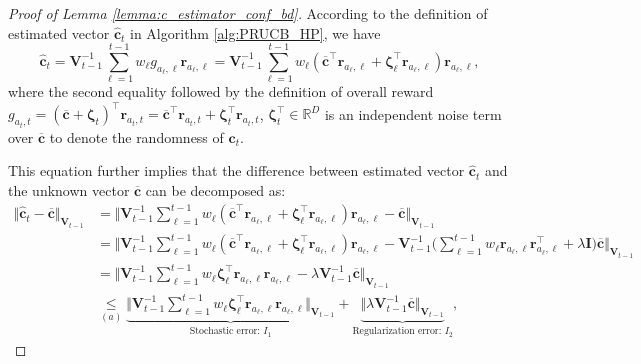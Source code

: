 \begin{proof}[Proof of Lemma \ref{lemma:c_estimator_conf_bd}]

According to the definition of estimated vector $\hat{\boldsymbol{c}}_{t}$ in Algorithm \ref{alg:PRUCB_HP}, we have 
\[
\hat{\boldsymbol{c}}_{t} 
=
\boldsymbol{V}_{t-1}^{-1} \sum_{\ell = 1}^{t-1} w_{\ell} g_{a_{\ell}, \ell} \boldsymbol{r}_{a_{\ell}, \ell} 
= 
\boldsymbol{V}_{t-1}^{-1} \sum_{\ell = 1}^{t-1} w_{\ell} (\boldsymbol{\overline{c}}^{\top} \boldsymbol{r}_{a_{\ell}, \ell} + \boldsymbol{\zeta}_{\ell}^{\top} \boldsymbol{r}_{a_{\ell}, \ell}) \boldsymbol{r}_{a_{\ell}, \ell},
\]
where the second equality followed by the definition of overall reward $g_{a_t,t} = (\boldsymbol{\overline{c}} + \boldsymbol{\zeta}_t)^{\top} \boldsymbol{r}_{a_t,t} = \boldsymbol{\overline{c}}^{\top} \boldsymbol{r}_{a_t,t} + \boldsymbol{\zeta}_t^{\top} \boldsymbol{r}_{a_t,t}$, $\boldsymbol{\zeta}_t^{\top} \in \mathbb{R}^{D}$ is an independent noise term over $\overline{\boldsymbol{c}}$ to denote the randomness of $\boldsymbol{c}_t$.

This equation further implies that the difference between estimated vector $\hat{\boldsymbol{c}}_{t}$ and the unknown vector $\overline{\boldsymbol{c}}$ can be decomposed as:
\begin{equation}
\begin{aligned}
\label{eq:hidden_conf_c}
\Vert \hat{\boldsymbol{c}}_{t} -\overline{\boldsymbol{c}} \Vert_{\boldsymbol{V}_{t-1}}
& = 
\Big \Vert 
\boldsymbol{V}_{t-1}^{-1} \sum_{\ell = 1}^{t-1} w_{\ell} (\boldsymbol{\overline{c}}^{\top} \boldsymbol{r}_{a_{\ell}, \ell} + \boldsymbol{\zeta}_{\ell}^{\top} \boldsymbol{r}_{a_{\ell}, \ell}) \boldsymbol{r}_{a_{\ell}, \ell} - \overline{\boldsymbol{c}}
\Big \Vert_{\boldsymbol{V}_{t-1}} \\
& = 
\Big \Vert 
\boldsymbol{V}_{t-1}^{-1} \sum_{\ell = 1}^{t-1} w_{\ell} (\boldsymbol{\overline{c}}^{\top} \boldsymbol{r}_{a_{\ell}, \ell} + \boldsymbol{\zeta}_{\ell}^{\top} \boldsymbol{r}_{a_{\ell}, \ell}) \boldsymbol{r}_{a_{\ell}, \ell} - 
\boldsymbol{V}_{t-1}^{-1} \big( \sum_{\ell = 1}^{t-1} w_{\ell} \boldsymbol{r}_{a_{\ell},\ell} \boldsymbol{r}_{a_{\ell},\ell}^{\top} + \lambda \boldsymbol{I} \big)
\overline{\boldsymbol{c}}
\Big \Vert_{\boldsymbol{V}_{t-1}} \\
& = 
\Big \Vert 
\boldsymbol{V}_{t-1}^{-1} \sum_{\ell = 1}^{t-1} w_{\ell} \boldsymbol{\zeta}_{\ell}^{\top} \boldsymbol{r}_{a_{\ell}, \ell} \boldsymbol{r}_{a_{\ell}, \ell} - 
\lambda \boldsymbol{V}_{t-1}^{-1} \overline{\boldsymbol{c}}
\Big \Vert_{\boldsymbol{V}_{t-1}} \\
& \underset{(a)}{\leq}
\underbrace{
\Big \Vert 
\boldsymbol{V}_{t-1}^{-1} \sum_{\ell = 1}^{t-1} w_{\ell} \boldsymbol{\zeta}_{\ell}^{\top} \boldsymbol{r}_{a_{\ell}, \ell} \boldsymbol{r}_{a_{\ell}, \ell}
\Big \Vert_{\boldsymbol{V}_{t-1}} 
}_{\text{Stochastic error: } I_1}
+
\underbrace{
\Big \Vert 
\lambda \boldsymbol{V}_{t-1}^{-1} \overline{\boldsymbol{c}}
\Big \Vert_{\boldsymbol{V}_{t-1}} 
}_{\text{Regularization error: } I_2},
\end{aligned}
\end{equation}


\end{proof}
